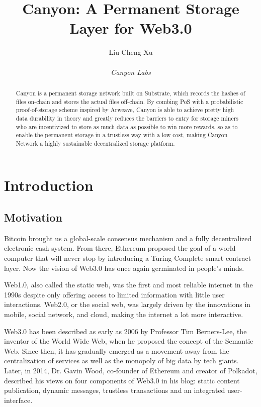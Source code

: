 \documentclass[]{article}
\title{Canyon: A Permanent Storage Layer for Web3.0}
\author{
    Liu-Cheng Xu\\
    \\
    \textit{Canyon Labs}
}
\date{}
\begin{document}
\maketitle

\begin{abstract}

Canyon is a permanent storage network built on Substrate, which records the hashes of files on-chain and stores the actual files off-chain. By combing PoS with a probabilistic proof-of-storage scheme inspired by Arweave, Canyon is able to achieve pretty high data durability in theory and greatly reduces the barriers to entry for storage miners who are incentivized to store as much data as possible to win more rewards, so as to enable the permanent storage in a trustless way with a low cost, making Canyon Network a highly sustainable decentralized storage platform.

\end{abstract}

\tableofcontents

\newpage

\section{Introduction}

\subsection{Motivation}

Bitcoin\cite{bitcoin} brought us a global-scale consensus mechanism and a fully decentralized electronic cash system. From there, Ethereum\cite{ethereum} proposed the goal of a world computer that will never stop by introducing a Turing-Complete smart contract layer. Now the vision of Web3.0 has once again germinated in people's minds.

Web1.0, also called the static web, was the first and most reliable internet in the 1990s despite only offering access to limited information with little user interactions. Web2.0, or the social web, was largely driven by the innovations in mobile, social network, and cloud, making the internet a lot more interactive.

Web3.0 has been described as early as 2006 by Professor Tim Berners-Lee, the inventor of the World Wide Web, when he proposed the concept of the Semantic Web. Since then, it has gradually emerged as a movement away from the centralization of services as well as the monopoly of big data by tech giants. Later, in 2014, Dr. Gavin Wood, co-founder of Ethereum and creator of Polkadot, described his views on four components of Web3.0\cite{gav2014web3} in his blog: static content publication, dynamic messages, trustless transactions and an integrated user-interface.
\end{document}
